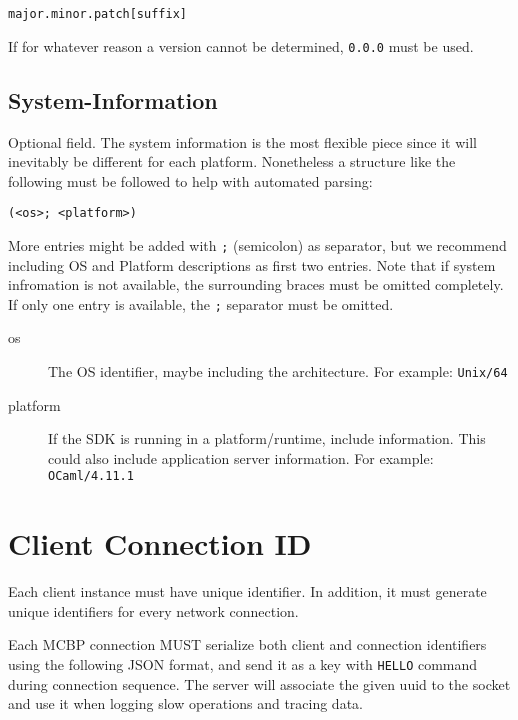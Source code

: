 \documentclass{report}
\begin{document}
\begin{verbatim}
major.minor.patch[suffix]
\end{verbatim}

If for whatever reason a version cannot be determined, \texttt{0.0.0} must be used.

\subsection{System-Information}

Optional field. The system information is the most flexible piece since it will inevitably be different for each
platform. Nonetheless a structure like the following must be followed to help with automated parsing:

\begin{verbatim}
(<os>; <platform>)
\end{verbatim}

More entries might be added with \texttt{;} (semicolon) as separator, but we recommend including OS and Platform
descriptions as first two entries. Note that if system infromation is not  available, the surrounding braces must be
omitted completely. If only one entry is available, the \texttt{;} separator must be omitted.

\begin{description}
    \item[os]
        The OS identifier, maybe including the architecture.  For example: \texttt{Unix/64}
    \item[platform]
        If the SDK is running in a platform/runtime, include information. This could also include application server
        information. For example: \texttt{OCaml/4.11.1}
\end{description}

\section{Client Connection ID}

Each client instance must have unique identifier. In addition, it must generate unique identifiers for every network
connection.

Each MCBP connection MUST serialize both client and connection identifiers using the following JSON format, and send it
as a key with \texttt{HELLO} command during connection sequence. The server will associate the given uuid to the socket
and use it when logging slow operations and tracing data.
\end{document}

